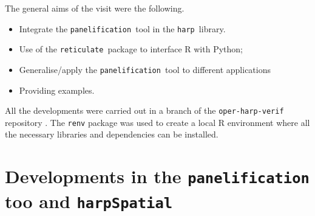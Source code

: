 \documentclass[11pt,a4paper]{article}
\newcommand{\retis}{\texttt{reticulate }}
\newcommand{\panels}{\texttt{panelification }}
\newcommand{\harps}{\texttt{harp }}
\newcommand{\harpss}{\texttt{harpSpatial }}
\newcommand {\sectionrule}{\vskip -0.9 cm
\color {mygray} \rule [0 cm] {17 cm}{0.1 mm} \color {black}}
\begin{document}
The general aims of the visit were the following.
\begin{itemize}
    \item Integrate the \panels tool in the \harps library.
    \item Use of the \retis package to interface R with Python;
    \item Generalise/apply the \panels tool to different applications
    \item Providing examples.
\end{itemize}

All the developments were carried out in a branch of the \texttt{oper-harp-verif} repository \cite{oper-harp}.
The \texttt{renv} package was used to create a local R environment where all
the necessary libraries and dependencies can be installed.

\section{Developments in the \panels too and \harpss}

\end{document}
